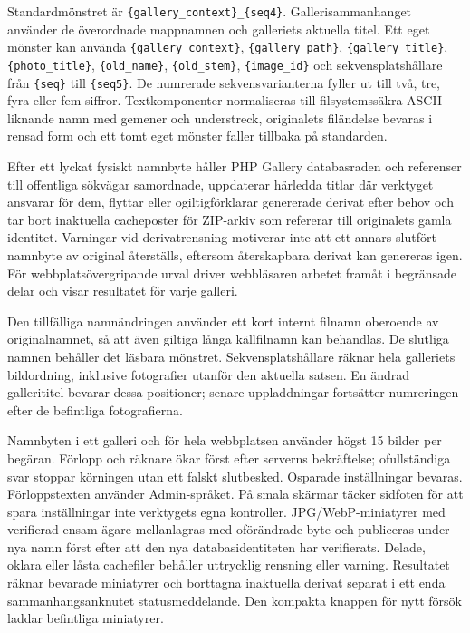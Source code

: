 \documentclass[11pt,a4paper]{article}
\newcommand{\codeword}[1]{\nolinkurl{#1}}
\begin{document}
Standardmönstret är \codeword{\{gallery_context\}_\{seq4\}}. Gallerisammanhanget
använder de överordnade mappnamnen och galleriets aktuella titel. Ett eget
mönster kan använda \codeword{\{gallery_context\}}, \codeword{\{gallery_path\}},
\codeword{\{gallery_title\}},
\codeword{\{photo_title\}}, \codeword{\{old_name\}}, \codeword{\{old_stem\}},
\codeword{\{image_id\}} och sekvensplatshållare från \codeword{\{seq\}} till
\codeword{\{seq5\}}. De numrerade sekvensvarianterna fyller ut till två, tre,
fyra eller fem siffror. Textkomponenter normaliseras till filsystemssäkra
ASCII-liknande namn med gemener och understreck, originalets filändelse bevaras
i rensad form och ett tomt eget mönster faller tillbaka på standarden.

Efter ett lyckat fysiskt namnbyte håller PHP Gallery databasraden och referenser
till offentliga sökvägar samordnade, uppdaterar härledda titlar där verktyget
ansvarar för dem, flyttar eller ogiltigförklarar genererade derivat efter behov
och tar bort inaktuella cacheposter för ZIP-arkiv som refererar till originalets
gamla identitet. Varningar vid derivatrensning motiverar inte att ett annars
slutfört namnbyte av original återställs, eftersom återskapbara derivat kan
genereras igen. För webbplatsövergripande urval driver webbläsaren arbetet
framåt i begränsade delar och visar resultatet för varje galleri.

Den tillfälliga namnändringen använder ett kort internt filnamn oberoende av
originalnamnet, så att även giltiga långa källfilnamn kan behandlas. De slutliga
namnen behåller det läsbara mönstret. Sekvensplatshållare räknar hela galleriets
bildordning, inklusive fotografier utanför den aktuella satsen. En ändrad
gallerititel bevarar dessa positioner; senare uppladdningar fortsätter
numreringen efter de befintliga fotografierna.

Namnbyten i ett galleri och för hela webbplatsen använder högst 15 bilder per
begäran. Förlopp och räknare ökar först efter serverns bekräftelse;
ofullständiga svar stoppar körningen utan ett falskt slutbesked. Osparade
inställningar bevaras.
Förloppstexten använder Admin-språket. På smala skärmar täcker sidfoten för att
spara inställningar inte verktygets egna kontroller.
JPG/WebP-miniatyrer med verifierad ensam ägare mellanlagras med oförändrade byte
och publiceras under nya namn först efter att den nya databasidentiteten har
verifierats. Delade, oklara eller låsta cachefiler behåller uttrycklig rensning
eller varning. Resultatet räknar bevarade miniatyrer och borttagna inaktuella
derivat separat i ett enda sammanhangsanknutet statusmeddelande. Den kompakta
knappen för nytt försök laddar befintliga
miniatyrer.
\end{document}
